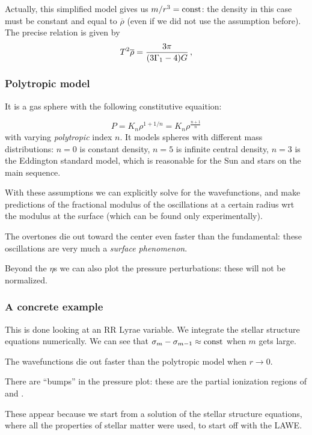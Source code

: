 \documentclass[main.tex]{subfiles}
\begin{document}
Actually, this simplified model gives us \(m / r^3 = \text{const}\): the density in this case must be constant and equal to \(\overline{\rho}\) (even if we did not use the assumption before). 
The precise relation is given by 
%
\begin{align}
T^2 \overline{\rho} = \frac{3 \pi }{\qty(3 \Gamma_1 -4) G}
\,,
\end{align}
%


\subsubsection{Polytropic model}

It is a gas sphere with the following constitutive equaition:

\begin{equation}
  P = K_n \rho^{1 + 1/n} = K_n \rho^{\frac{n+1}{n}}
\end{equation}
%
with varying \emph{polytropic} index \(n\).
It models spheres with different mass distributions:
\(n=0\) is constant density, \(n=5\) is infinite central density, \(n=3\) is the Eddington standard model, which is reasonable for the Sun and stars on the main sequence.

With these assumptions we can explicitly solve for the wavefunctions, and make predictions of the fractional modulus of the oscillations at a certain radius wrt the modulus at the surface (which can be found only experimentally).

The overtones die out toward the center even faster than the fundamental: these oscillations are very much a \emph{surface phenomenon}.

Beyond the \(\eta\)s we can also plot the pressure perturbations: these will not be normalized.

\subsubsection{A concrete example}

This is done looking at an RR Lyrae variable.
We integrate the stellar structure equations numerically.
We can see that \(\sigma_m - \sigma_{m-1} \approx \text{const}\) when \(m\) gets large.

The wavefunctions die out faster than the polytropic model when \(r \rightarrow 0\).

There are ``bumps'' in the pressure plot: these are the partial ionization regions of  and .

These appear because we start from a solution of the stellar structure equations, where all the properties of stellar matter were used, to start off with the LAWE.
\end{document}
